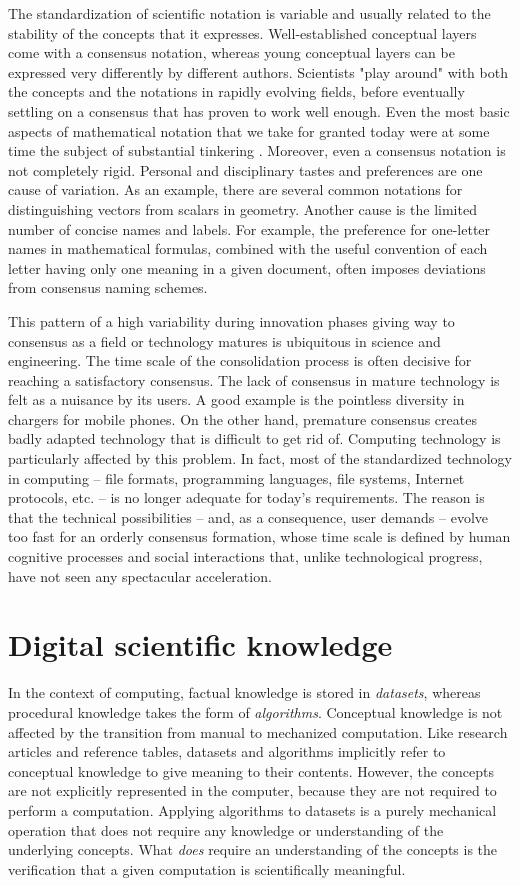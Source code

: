 The standardization of scientific notation is variable and usually related to the stability of the concepts that it expresses. Well-established conceptual layers come with a consensus notation, whereas young conceptual layers can be expressed very differently by different authors. Scientists "play around" with both the concepts and the notations in rapidly evolving fields, before eventually settling on a consensus that has proven to work well enough. Even the most basic aspects of mathematical notation that we take for granted today were at some time the subject of substantial tinkering \cite{_history_2016}. Moreover, even a consensus notation is not completely rigid. Personal and disciplinary tastes and preferences are one cause of variation. As an example, there are several common notations for distinguishing vectors from scalars in geometry. Another cause is the limited number of concise names and labels. For example, the preference for one-letter names in mathematical formulas, combined with the useful convention of each letter having only one meaning in a given document, often imposes deviations from consensus naming schemes.

This pattern of a high variability during innovation phases giving way to consensus as a field or technology matures is ubiquitous in science and engineering. The time scale of the consolidation process is often decisive for reaching a satisfactory consensus. The lack of consensus in mature technology is felt as a nuisance by its users. A good example is the pointless diversity in chargers for mobile phones. On the other hand, premature consensus creates badly adapted technology that is difficult to get rid of. Computing technology is particularly affected by this problem. In fact, most of the standardized technology in computing -- file formats, programming languages, file systems, Internet protocols, etc. -- is no longer adequate for today's requirements. The reason is that the technical possibilities -- and, as a consequence, user demands -- evolve too fast for an orderly consensus formation, whose time scale is defined by human cognitive processes and social interactions that, unlike technological progress, have not seen any spectacular acceleration.

\section{Digital scientific knowledge}
\label{digital}

In the context of computing, factual knowledge is stored in \textit{datasets}, whereas procedural knowledge takes the form of \textit{algorithms}. Conceptual knowledge is not affected by the transition from manual to mechanized computation. Like research articles and reference tables, datasets and algorithms implicitly refer to conceptual knowledge to give meaning to their contents. However, the concepts are not explicitly represented in the computer, because they are not required to perform a computation. Applying algorithms to datasets is a purely mechanical operation that does not require any knowledge or understanding of the underlying concepts. What \textit{does} require an understanding of the concepts is the verification that a given computation is scientifically meaningful.

